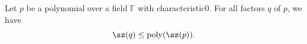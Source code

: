 \setcounter{nttheorem}{9}
\begin{nttheorem}
Let $p$ be a polynomial over a field $\mathbb F$ with characteristic0. For all factors $q$ of $p$, we have
\[\sz(q)\leq\operatorname{poly}(\sz(p)).\]
\end{nttheorem}
